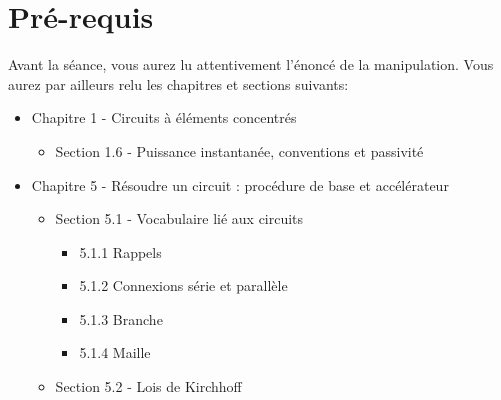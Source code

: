 \pagestyle{fancy}
\cfoot{}





\setlength{\parskip}{0.5cm plus4mm minus3mm} %
\setlength{\parindent}{0pt}





\section{Pré-requis}
Avant la séance, vous aurez lu attentivement l'énoncé de la manipulation. Vous aurez par ailleurs relu les chapitres et sections suivants:
\begin{itemize}
	\item Chapitre 1 - Circuits à éléments concentrés
	\begin{itemize}
		\item Section 1.6 - Puissance instantanée, conventions et passivité
	\end{itemize}
	\item Chapitre 5 - Résoudre un circuit : procédure de base et accélérateur
	\begin{itemize}
		\item Section 5.1 -  Vocabulaire lié aux circuits
		\begin{itemize}
			\item 5.1.1 Rappels 
			\item 5.1.2 Connexions série et parallèle
			\item 5.1.3 Branche
			\item 5.1.4 Maille 
		\end{itemize}
		\item Section 5.2 - Lois de Kirchhoff
	\end{itemize}
\end{itemize}

